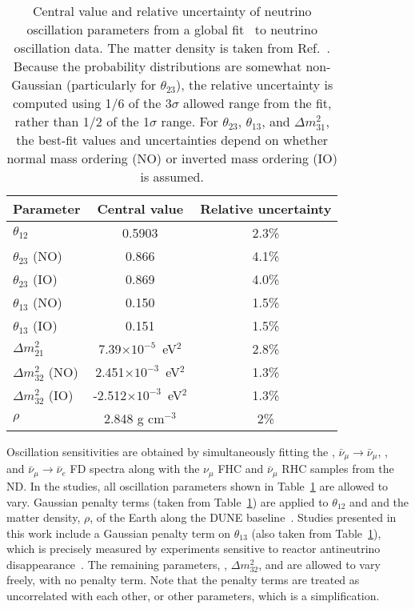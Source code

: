 \begin{table}[htbp]
    \centering
    \begin{tabular}{lcc}
      \hline
      Parameter &    Central value & Relative uncertainty \\
      \hline\hline
      $\theta_{12}$ & 0.5903 & 2.3\% \\ \hline
      $\theta_{23}$ (NO) & 0.866  & 4.1\% \\ 
      $\theta_{23}$ (IO) & 0.869  & 4.0\% \\ \hline
      $\theta_{13}$ (NO) & 0.150  & 1.5\% \\ 
      $\theta_{13}$ (IO) & 0.151  & 1.5\% \\ \hline
      $\Delta m^2_{21}$ & 7.39$\times10^{-5}$~eV$^2$ & 2.8\% \\ \hline
      $\Delta m^2_{32}$ (NO) & 2.451$\times10^{-3}$~eV$^2$ &  1.3\% \\
      $\Delta m^2_{32}$ (IO) & -2.512$\times10^{-3}$~eV$^2$ &  1.3\% \\
      \hline
      $\rho$ & 2.848 g cm$^{-3}$ & 2\% \\
      \hline
    \end{tabular}
    \caption{Central value and relative uncertainty of neutrino oscillation parameters from a global fit~\cite{Esteban:2018azc,nufitweb} to neutrino oscillation data. The matter density is taken from Ref.~\cite{Roe:2017zdw}. Because the probability distributions are somewhat non-Gaussian (particularly for $\theta_{23}$), the relative uncertainty is computed using 1/6 of the 3$\sigma$ allowed range from the fit, rather than 1/2 of the 1$\sigma$ range. For $\theta_{23}$, $\theta_{13}$, and $\Delta m^2_{31}$, the best-fit values and uncertainties depend on whether normal mass ordering (NO) or inverted mass ordering (IO) is assumed.}
    \label{tab:oscpar_nufit}
\end{table}
Oscillation sensitivities are obtained by simultaneously fitting the \numutonumu, $\bar{\nu}_\mu \rightarrow \bar{\nu}_\mu$, \numutonue, and $\bar{\nu}_\mu \rightarrow \bar{\nu}_e$ FD spectra along with the $\nu_{\mu}$ FHC and $\bar{\nu}_{\mu}$ RHC samples from the ND. In the studies, all oscillation parameters shown in Table~\ref{tab:oscpar_nufit} are allowed to vary. Gaussian penalty terms (taken from Table~\ref{tab:oscpar_nufit}) are applied to $\theta_{12}$ and  and the matter density, $\rho$, of the Earth along the DUNE baseline~\cite{Roe:2017zdw}. Studies presented in this work include a Gaussian penalty term on $\theta_{13}$ (also taken from Table~\ref{tab:oscpar_nufit}), which is precisely measured by experiments sensitive to reactor antineutrino disappearance~\cite{Abe:2014bwa,Adey:2018zwh,Bak:2018ydk}\addcite. The remaining parameters, , $\Delta m^{2}_{32}$, and \deltacp are allowed to vary freely, with no penalty term. Note that the penalty terms are treated as uncorrelated with each other, or other parameters, which is a simplification.

